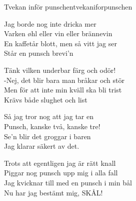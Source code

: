 \begin{song}{Tvekan inför punschen}{tvekaniforpunschen}
\begin{vers}
Jag borde nog inte dricka mer\\
Varken øhl eller vin eller brännevin\\
En kaffetår blott, men så vitt jag ser \\
Står en punsch brevi'n\\
\end{vers}
\begin{vers}
Tänk vilken underbar färg och odör!\\
-Nej, det blir bara man bråkar och stör\\
Men för att inte min kväll ska bli trist\\
Krävs både slughet och list\\
\end{vers}
\begin{vers}
Så jag tror nog att jag tar en\\
Punsch, kanske två, kanske tre!\\
Se'n blir det groggar i baren\\
Jag klarar säkert av det.
\end{vers}
\begin{vers}
Trots att egentligen jag är rätt knall\\
Piggar nog punsch upp mig i alla fall\\
Jag kvicknar till med en punsch i min bål\\
Nu har jag bestämt mig, SKÅL!\\
\end{vers}
\end{song}
